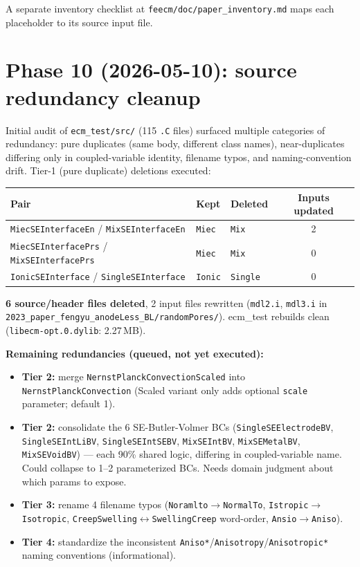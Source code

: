 \documentclass[11pt,letterpaper]{article}
\newenvironment{tightitemize}{\begin{itemize}\setlength\itemsep{0pt}\setlength\parsep{0pt}}{\end{itemize}}
\newcommand{\code}[1]{\texttt{\small #1}}
\begin{document}
A separate inventory checklist at \code{feecm/doc/paper\_inventory.md} maps each placeholder to its source input file.

\section{Phase 10 (2026-05-10): source redundancy cleanup}

Initial audit of \code{ecm\_test/src/} (115 \code{.C} files) surfaced multiple categories of redundancy: pure duplicates (same body, different class names), near-duplicates differing only in coupled-variable identity, filename typos, and naming-convention drift. Tier-1 (pure duplicate) deletions executed:

\begin{center}
\begin{tabular}{l l l c}
\toprule
Pair & Kept & Deleted & Inputs updated \\
\midrule
\code{MiecSEInterfaceEn} / \code{MixSEInterfaceEn} & \code{Miec} & \code{Mix} & 2 \\
\code{MiecSEInterfacePrs} / \code{MixSEInterfacePrs} & \code{Miec} & \code{Mix} & 0 \\
\code{IonicSEInterface} / \code{SingleSEInterface} & \code{Ionic} & \code{Single} & 0 \\
\bottomrule
\end{tabular}
\end{center}

\textbf{6 source/header files deleted}, 2 input files rewritten (\code{mdl2.i}, \code{mdl3.i} in \code{2023\_paper\_fengyu\_anodeLess\_BL/randomPores/}). ecm\_test rebuilds clean (\code{libecm-opt.0.dylib}: 2.27\,MB).

\textbf{Remaining redundancies (queued, not yet executed):}
\begin{tightitemize}
  \item \textbf{Tier 2:} merge \code{NernstPlanckConvectionScaled} into \code{NernstPlanckConvection} (Scaled variant only adds optional \code{scale} parameter; default 1).
  \item \textbf{Tier 2:} consolidate the 6 SE-Butler-Volmer BCs (\code{SingleSEElectrodeBV}, \code{SingleSEIntLiBV}, \code{SingleSEIntSEBV}, \code{MixSEIntBV}, \code{MixSEMetalBV}, \code{MixSEVoidBV}) --- each 90\% shared logic, differing in coupled-variable name. Could collapse to 1--2 parameterized BCs. Needs domain judgment about which params to expose.
  \item \textbf{Tier 3:} rename 4 filename typos (\code{Noramlto}$\to$\code{NormalTo}, \code{Istropic}$\to$\code{Isotropic}, \code{CreepSwelling}$\leftrightarrow$\code{SwellingCreep} word-order, \code{Ansio}$\to$\code{Aniso}).
  \item \textbf{Tier 4:} standardize the inconsistent \code{Aniso*}/\code{*Anisotropy}/\code{Anisotropic*} naming conventions (informational).
\end{tightitemize}
\end{document}
